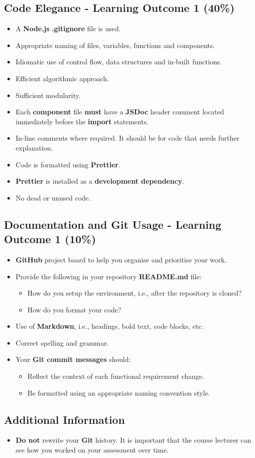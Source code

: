 \documentclass{article}
\begin{document}
\subsection*{Code Elegance - Learning Outcome 1 (40\%)}
\begin{itemize}
	\item A \textbf{Node.js} \textbf{.gitignore} file is used.
  \item Appropriate naming of files, variables, functions and components.
	\item Idiomatic use of control flow, data structures and in-built functions.
  \item Efficient algorithmic approach.
  \item Sufficient modularity.
  \item Each \textbf{component} file \textbf{must} have a \textbf{JSDoc} header comment located immediately before the \textbf{import} statements.
\item In-line comments where required. It should be for code that needs further explanation.
  \item Code is formatted using \textbf{Prettier}.
  \item \textbf{Prettier} is installed as a \textbf{development dependency}.	
\item No dead or unused code. 
\end{itemize}

\subsection*{Documentation and Git Usage - Learning Outcome 1 (10\%)}
\begin{itemize}
	\item \textbf{GitHub} project board to help you organise and prioritise your work. 
    \item Provide the following in your repository \textbf{README.md} file:
    \begin{itemize} 
      \item How do you setup the environment, i.e., after the repository is cloned?
      \item How do you format your code?
    \end{itemize}
    \item Use of \textbf{Markdown}, i.e., headings, bold text, code blocks, etc.
    \item Correct spelling and grammar.
    \item Your \textbf{Git commit messages} should:
    \begin{itemize}
      \item Reflect the context of each functional requirement change.
      \item Be formatted using an appropriate naming convention style.
    \end{itemize}	
\end{itemize}
          
\subsection*{Additional Information}
\begin{itemize}
    \item \textbf{Do not} rewrite your \textbf{Git} history. It is important that the course lecturer can see how you worked on your assessment over time. 
\end{itemize} 
\end{document}
